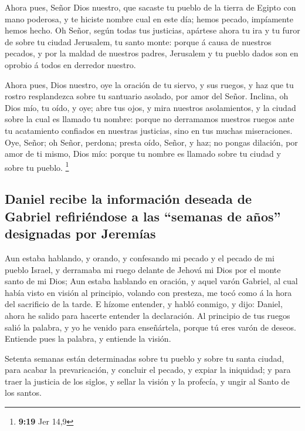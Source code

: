  Ahora pues, Señor Dios nuestro, que sacaste tu pueblo de
la tierra de Egipto con mano poderosa, y te hiciste nombre cual en este
día; hemos pecado, impíamente hemos hecho.  Oh Señor,
según todas tus justicias, apártese ahora tu ira y tu furor de sobre tu
ciudad Jerusalem, tu santo monte: porque á causa de nuestros pecados, y
por la maldad de nuestros padres, Jerusalem y tu pueblo dados son en
oprobio á todos en derredor nuestro.

 Ahora pues, Dios nuestro, oye la oración de tu siervo, y
sus ruegos, y haz que tu rostro resplandezca sobre tu santuario asolado,
por amor del Señor.  Inclina, oh Dios mío, tu oído, y
oye; abre tus ojos, y mira nuestros asolamientos, y la ciudad sobre la
cual es llamado tu nombre: porque no derramamos nuestros ruegos ante tu
acatamiento confiados en nuestras justicias, sino en tus muchas
miseraciones.  Oye, Señor; oh Señor, perdona; presta
oído, Señor, y haz; no pongas dilación, por amor de ti mismo, Dios mío:
porque tu nombre es llamado sobre tu ciudad y sobre tu pueblo.
\footnote{\textbf{9:19} Jer 14,9}

\hypertarget{daniel-recibe-la-informaciuxf3n-deseada-de-gabriel-refiriuxe9ndose-a-las-semanas-de-auxf1os-designadas-por-jeremuxedas}{%
\subsection{Daniel recibe la información deseada de Gabriel refiriéndose
a las ``semanas de años'' designadas por
Jeremías}\label{daniel-recibe-la-informaciuxf3n-deseada-de-gabriel-refiriuxe9ndose-a-las-semanas-de-auxf1os-designadas-por-jeremuxedas}}

 Aun estaba hablando, y orando, y confesando mi pecado y
el pecado de mi pueblo Israel, y derramaba mi ruego delante de Jehová mi
Dios por el monte santo de mi Dios;  Aun estaba hablando
en oración, y aquel varón Gabriel, al cual había visto en visión al
principio, volando con presteza, me tocó como á la hora del sacrificio
de la tarde.  E hízome entender, y habló conmigo, y dijo:
Daniel, ahora he salido para hacerte entender la declaración.
 Al principio de tus ruegos salió la palabra, y yo he
venido para enseñártela, porque tú eres varón de deseos. Entiende pues
la palabra, y entiende la visión.

 Setenta semanas están determinadas sobre tu pueblo y
sobre tu santa ciudad, para acabar la prevaricación, y concluir el
pecado, y expiar la iniquidad; y para traer la justicia de los siglos, y
sellar la visión y la profecía, y ungir al Santo de los santos.

